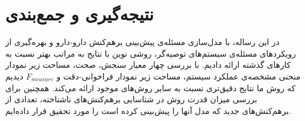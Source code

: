 \section{نتیجه‌گیری و جمع‌بندی}
در این رساله، با مدل‌سازی مسئله‌ی پیش‌بینی برهم‌کنش دارو-دارو و بهره‌گیری از رویکردهای مسئله‌ی سیستم‌های توصیه‌گر، روشی نوین با نتایج به مراتب بهتر نسبت به کارهای گذشته ارائه دادیم. با بررسی چهار معیار سنجش، صحت، مساحت زیر نمودار منحنی مشخصه‌ی عملکرد سیستم، مساحت زیر نمودار فراخوانی-دقت و 
$F_{measure}$
 دیدیم که روش ما نتایج دقیق‌تری نسبت به سایر روش‌های موجود ارائه می‌کند. همچنین برای بررسی میزان قدرت روش
در شناسایی برهم‌کنش‌های ناشناخته، تعدادی از برهم‌کنش‌های جدید که مدل آنها را پیش‌بینی کرده است را مورد تحقیق قرار داده‌ایم.





